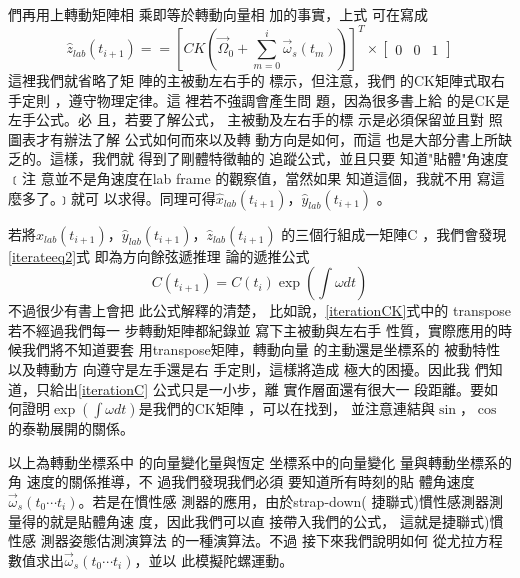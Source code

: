 \documentclass[12pt,twoside]{article}
\begin{document}
們再用上轉動矩陣相%
乘即等於轉動向量相%
加的事實\cite{goldstein}，上式%
可在寫成%
\begin{equation}
\hat{z}_{lab}\left( t_{i+1}\right) ==\left[ CK\left( \vec{\Omega}%
_{0}+\sum\limits_{m=0}^{i}\vec{\omega}_{s}\left( t_{m}\right) \right) \right]
^{T}\times \left[ 
\begin{array}{ccc}
0 & 0 & 1%
\end{array}%
\right]   \label{iterateeq2}
\end{equation}%
這裡我們就省略了矩%
陣的主被動左右手的%
標示，但注意，我們%
的CK矩陣式取右手定則%
，遵守物理定律。這%
裡若不強調會產生問%
題，因為很多書上給%
的是CK是左手公式。必%
且，若要了解公式，%
主被動及左右手的標%
示是必須保留並且對%
照圖表才有辦法了解%
公式如何而來以及轉%
動方向是如何，而這%
也是大部分書上所缺%
乏的。這樣，我們就%
得到了剛體特徵軸的%
追蹤公式，並且只要%
知道"貼體"角速度﹝注%
意並不是角速度在lab frame%
的觀察值，當然如果%
知道這個，我就不用%
寫這麼多了。﹞就可%
以求得。同理可得$\hat{x}%
_{lab}\left( t_{i+1}\right) $，$\hat{y}_{lab}\left( t_{i+1}\right) $%
。

\bigskip 若將$\hat{x}_{lab}\left( t_{i+1}\right) $，$\hat{y%
}_{lab}\left( t_{i+1}\right) $，$\hat{z}_{lab}\left( t_{i+1}\right) $%
的三個行組成一矩陣C%
，我們會發現\ref{iterateeq2}式%
即為方向餘弦遞推理%
論的遞推公式\cite{titterton}%
\begin{equation}
C(t_{i+1})=C(t_{i})\exp (\int \omega dt)  \label{iterationC}
\end{equation}%
不過很少有書上會把%
此公式解釋的清楚，%
比如說，\ref{iterationCK}式中的%
transpose若不經過我們每一%
步轉動矩陣都紀錄並%
寫下主被動與左右手%
性質，實際應用的時%
候我們將不知道要套%
用transpose矩陣，轉動向量%
的主動還是坐標系的%
被動特性以及轉動方%
向遵守是左手還是右%
手定則，這樣將造成%
極大的困擾。因此我%
們知道，只給出\ref{iterationC}%
公式只是一小步，離%
實作層面還有很大一%
段距離。要如何證明$%
\exp (\int \omega dt)$是我們的CK矩陣%
，可以在\cite[Page 49]{tong}找到，%
並注意連結與$\sin $，$\cos $%
的泰勒展開的關係。

以上為轉動坐標系中%
的向量變化量與恆定%
坐標系中的向量變化%
量與轉動坐標系的角%
速度的關係推導，不%
過我們發現我們必須%
要知道所有時刻的貼%
體角速度$\vec{\omega}_{s}\left( t_{0}\cdots
t_{i}\right) $。若是在慣性感%
測器的應用，由於strap-down(%
捷聯式)慣性感測器測%
量得的就是貼體角速%
度，因此我們可以直%
接帶入我們的公式，%
這就是捷聯式)慣性感%
測器姿態估測演算法%
的一種演算法。不過%
接下來我們說明如何%
從尤拉方程數值求出$%
\vec{\omega}_{s}\left( t_{0}\cdots t_{i}\right) $，並以%
此模擬陀螺運動。
\end{document}
